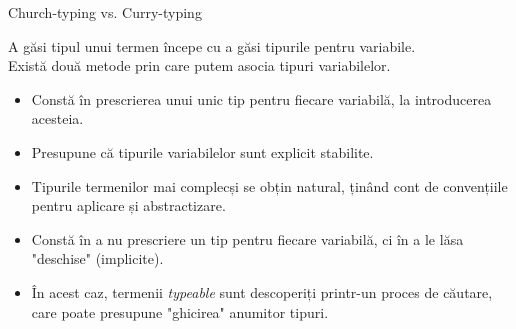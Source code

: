 \documentclass[xcolor=pdftex,romanian,colorlinks]{beamer}
\begin{document}
\begin{frame}{Church-typing vs. Curry-typing}

A găsi tipul unui termen începe cu a găsi tipurile pentru variabile. \\
Există două metode prin care putem asocia tipuri variabilelor.

\vspace{-.2cm}
\begin{itemize}
	\item Constă în prescrierea unui unic tip pentru fiecare variabilă, la introducerea acesteia.
	\item Presupune că tipurile variabilelor sunt explicit stabilite.
	\item Tipurile termenilor mai complecși se obțin natural, ținând cont de convențiile pentru aplicare și abstractizare.
\end{itemize}

\vspace{-.2cm}
\begin{itemize}
	\item Constă în a nu prescriere un tip pentru fiecare variabilă, ci în a le lăsa "deschise" (implicite).
	\item În acest caz, termenii \textit{typeable} sunt descoperiți printr-un proces de căutare, care poate presupune "ghicirea" anumitor tipuri.
\end{itemize}

\end{frame}
\end{document}

